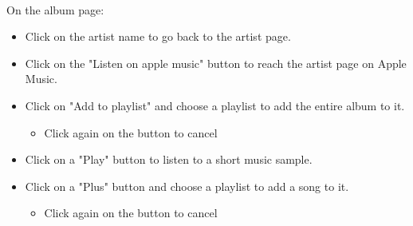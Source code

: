 \documentclass[11pt]{article}
\begin{document}
        \noindent \\
        On the album page:
        \begin{itemize}
        \item Click on the artist name to go back to the artist page.
        \item Click on the "Listen on apple music" button to reach the artist page on Apple Music.
        \item Click on "Add to playlist" and choose a playlist to add the entire album to it.
            \begin{itemize}
            \item Click again on the button to cancel
            \end{itemize}
        \item Click on a "Play" button to listen to a short music sample.
        \item Click on a "Plus" button and choose a playlist to add a song to it.
            \begin{itemize}
            \item Click again on the button to cancel
            \end{itemize}
        \end{itemize}
        
\end{document}
